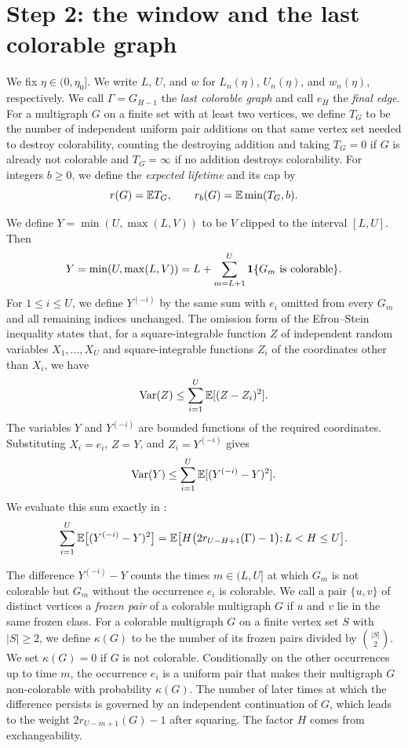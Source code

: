 \section{Step 2: the window and the last colorable graph}\label{sec:ov-lifetime}

We fix $\eta \in (0, \eta_0]$. We write $L$, $U$, and $w$ for $L_n(\eta)$, $U_n(\eta)$, and $w_n(\eta)$, respectively. We call $\Gamma = G_{H - 1}$ the \emph{last colorable graph} and call $e_H$ the \emph{final edge}. For a multigraph $G$ on a finite set with at least two vertices, we define $T_G$ to be the number of independent uniform pair additions on that same vertex set needed to destroy colorability, counting the destroying addition and taking $T_G = 0$ if $G$ is already not colorable and $T_G = \infty$ if no addition destroys colorability. For integers $b \ge 0$, we define the \emph{expected lifetime} and its cap by
\[
r(G) = \mathbb E T_G, \qquad r_b(G) = \mathbb E\min(T_G, b).
\]

We define $Y = \min(U, \max(L, V))$ to be $V$ clipped to the interval $[L, U]$. Then
\[
Y = \min(U, \max(L, V)) = L + \sum_{m = L + 1}^{U} \mathbf 1\{G_m \text{ is colorable}\}.
\]
For $1 \le i \le U$, we define $Y^{(-i)}$ by the same sum with $e_i$ omitted from every $G_m$ and all remaining indices unchanged. The omission form of the Efron--Stein inequality \cite[(3.6)]{boucheron2005moment} states that, for a square-integrable function $Z$ of independent random variables $X_1, \dots, X_U$ and square-integrable functions $Z_i$ of the coordinates other than $X_i$, we have
\[
\operatorname{Var}(Z) \le \sum_{i = 1}^U \mathbb E[(Z - Z_i)^2].
\]
The variables $Y$ and $Y^{(-i)}$ are bounded functions of the required coordinates. Substituting $X_i = e_i$, $Z = Y$, and $Z_i = Y^{(-i)}$ gives
\[
\operatorname{Var}(Y) \le \sum_{i = 1}^U\mathbb E[(Y^{(-i)} - Y)^2].
\]
We evaluate this sum exactly in :
\begin{equation}\label{eq:ov-deletion}
\sum_{i = 1}^{U} \mathbb E\bigl[(Y^{(-i)} - Y)^2\bigr] = \mathbb E\bigl[H \bigl(2 r_{U - H + 1}(\Gamma) - 1\bigr); L < H \le U\bigr].
\end{equation}

The difference $Y^{(-i)} - Y$ counts the times $m \in (L, U]$ at which $G_m$ is not colorable but $G_m$ without the occurrence $e_i$ is colorable. We call a pair $\{u, v\}$ of distinct vertices a \emph{frozen pair} of a colorable multigraph $G$ if $u$ and $v$ lie in the same frozen class. For a colorable multigraph $G$ on a finite vertex set $S$ with $|S| \ge 2$, we define $\kappa(G)$ to be the number of its frozen pairs divided by $\binom{|S|}{2}$. We set $\kappa(G) = 0$ if $G$ is not colorable. Conditionally on the other occurrences up to time $m$, the occurrence $e_i$ is a uniform pair that makes their multigraph $G$ non-colorable with probability $\kappa(G)$. The number of later times at which the difference persists is governed by an independent continuation of $G$, which leads to the weight $2r_{U - m + 1}(G) - 1$ after squaring. The factor $H$ comes from exchangeability.

